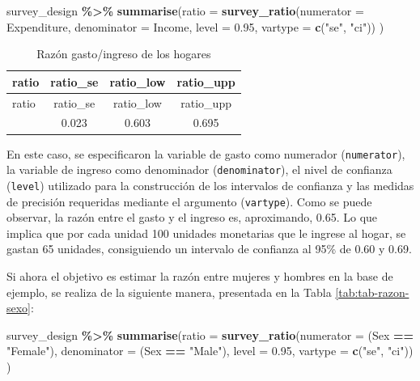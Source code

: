 \documentclass[
  spanish,
  12pt,
]{book}
\newenvironment{Shaded}{\begin{snugshade}}{\end{snugshade}}
\newcommand{\AttributeTok}[1]{\textcolor[rgb]{0.13,0.29,0.53}{#1}}
\newcommand{\FloatTok}[1]{\textcolor[rgb]{0.00,0.00,0.81}{#1}}
\newcommand{\FunctionTok}[1]{\textcolor[rgb]{0.13,0.29,0.53}{\textbf{#1}}}
\newcommand{\NormalTok}[1]{#1}
\newcommand{\SpecialCharTok}[1]{\textcolor[rgb]{0.81,0.36,0.00}{\textbf{#1}}}
\newcommand{\StringTok}[1]{\textcolor[rgb]{0.31,0.60,0.02}{#1}}
\begin{document}
\begin{Shaded}
\begin{Highlighting}[]
\NormalTok{survey\_design }\SpecialCharTok{\%\textgreater{}\%}
  \FunctionTok{summarise}\NormalTok{(}\AttributeTok{ratio =} \FunctionTok{survey\_ratio}\NormalTok{(}\AttributeTok{numerator =}\NormalTok{ Expenditure,}
                                 \AttributeTok{denominator =}\NormalTok{ Income,}
                                 \AttributeTok{level =} \FloatTok{0.95}\NormalTok{,}
                                 \AttributeTok{vartype =} \FunctionTok{c}\NormalTok{(}\StringTok{"se"}\NormalTok{, }\StringTok{"ci"}\NormalTok{))}
\NormalTok{            )}
\end{Highlighting}
\end{Shaded}

\begin{longtable}[]{@{}lccc@{}}
\caption{\label{tab:tab-razon-gasto-ingreso}Razón gasto/ingreso de los hogares}\tabularnewline
\toprule\noalign{}
ratio & ratio\_se & ratio\_low & ratio\_upp \\
\midrule\noalign{}
\endfirsthead
\toprule\noalign{}
ratio & ratio\_se & ratio\_low & ratio\_upp \\
\midrule\noalign{}
\endhead
\bottomrule\noalign{}
\endlastfoot
0.649 & 0.023 & 0.603 & 0.695 \\
\end{longtable}

En este caso, se especificaron la variable de gasto como numerador (\texttt{numerator}), la variable de ingreso como denominador (\texttt{denominator}), el nivel de confianza (\texttt{level}) utilizado para la construcción de los intervalos de confianza y las medidas de precisión requeridas mediante el argumento (\texttt{vartype}). Como se puede observar, la razón entre el gasto y el ingreso es, aproximando, 0.65. Lo que implica que por cada unidad 100 unidades monetarias que le ingrese al hogar, se gastan 65 unidades, consiguiendo un intervalo de confianza al 95\% de 0.60 y 0.69.

Si ahora el objetivo es estimar la razón entre mujeres y hombres en la base de ejemplo, se realiza de la siguiente manera, presentada en la Tabla \ref{tab:tab-razon-sexo}:

\begin{Shaded}
\begin{Highlighting}[]
\NormalTok{survey\_design }\SpecialCharTok{\%\textgreater{}\%}
  \FunctionTok{summarise}\NormalTok{(}\AttributeTok{ratio =} \FunctionTok{survey\_ratio}\NormalTok{(}\AttributeTok{numerator =}\NormalTok{ (Sex }\SpecialCharTok{==} \StringTok{"Female"}\NormalTok{),}
                                 \AttributeTok{denominator =}\NormalTok{ (Sex }\SpecialCharTok{==} \StringTok{"Male"}\NormalTok{),}
                                 \AttributeTok{level =} \FloatTok{0.95}\NormalTok{,}
                                 \AttributeTok{vartype =} \FunctionTok{c}\NormalTok{(}\StringTok{"se"}\NormalTok{, }\StringTok{"ci"}\NormalTok{))}
\NormalTok{            )}
\end{Highlighting}
\end{Shaded}
\end{document}

